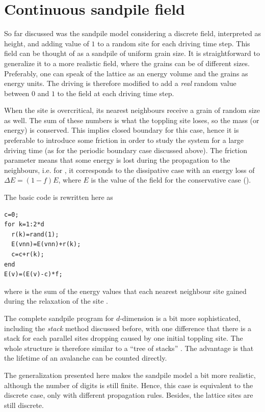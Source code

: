 \section{Continuous sandpile field}

So far discussed was the sandpile model considering a discrete field, interpreted as height, and adding value of $1$ to a random site for each driving time step. This field can be thought of as a sandpile of uniform grain size. It is straightforward to generalize it to a more realistic field, where the grains can be of different sizes. Preferably, one can speak of the lattice as an energy volume and the grains as energy units. The driving is therefore modified to add a \emph{real} random value between $0$ and $1$ to the field at each driving time step.

When the site is overcritical, its nearest neighbours receive a grain of random size as well. The sum of these numbers is what the toppling site loses, so the mass (or energy) is conserved. This implies closed boundary for this case, hence it is preferable to introduce some friction in order to study the system for a large driving time (as for the periodic boundary case discussed above). The friction parameter  means that some energy is lost during the propagation to the neighbours, i.e. for , it corresponds to the dissipative case with an energy loss of $\Delta E=(1-f)E$, where $E$ is the value of the field for the conservative case ().

The basic code is rewritten here as
\begin{lstlisting}
c=0;
for k=1:2*d
  r(k)=rand(1);
  E(vnn)=E(vnn)+r(k);
  c=c+r(k);
end
E(v)=(E(v)-c)*f;
\end{lstlisting}
where  is the sum of the energy values that each nearest neighbour site  gained during the relaxation of the site .

The complete sandpile program for $d$-dimension is a bit more sophisticated, including the \emph{stack} method discussed before, with one difference that there is a stack for each parallel sites dropping caused by one initial toppling site. The whole structure is therefore similar to a ``tree of stacks'' . The advantage is that the lifetime of an avalanche can be counted directly.

The generalization presented here makes the sandpile model a bit more realistic, although the number of digits is still finite. Hence, this case is equivalent to the discrete case, only with different propagation rules. Besides, the lattice sites are still discrete.
